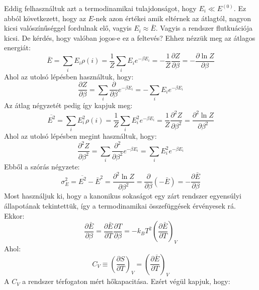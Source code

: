 \documentclass[../main.tex]{subfiles}
\begin{document}
Eddig felhasználtuk azt a termodinamikai tulajdonságot, hogy $E_i \ll E^{(0)}$. Ez abból következett, hogy az $E$-nek azon értékei amik eltérnek az átlagtól, nagyon kicsi valószínűséggel fordulnak elő,
vagyis $E_i \approx \bar{E}$. Vagyis a rendszer flutkuációja kicsi. De kérdés, hogy valóban jogos-e ez a feltevés? Ehhez nézzük meg az átlagos energiát:
\begin{equation}
    \bar{E} = \sum_i E_i \rho(i) = \frac{1}{Z} \sum_i E_i e^{-\beta E_i} = - \frac{1}{Z} \frac{\partial Z}{\partial \beta} = - \frac{\partial \ln Z}{\partial \beta}
\end{equation}
Ahol az utolsó lépésben használtuk, hogy:
\begin{equation}
    \frac{\partial Z}{\partial \beta} = \sum_i \frac{\partial}{\partial \beta} e^{-\beta E_i} = - \sum_i E_i e^{-\beta E_i}
\end{equation}
Az átlag négyzetét pedig így kapjuk meg:
\begin{equation}
    \overline{E^2} = \sum_i E_i^2 \rho(i) = \frac{1}{Z} \sum_i E_i^2 e^{-\beta E_i} = \frac{1}{Z} \frac{\partial^2 Z}{\partial \beta^2} = \frac{\partial^2 \ln Z}{\partial \beta^2}
\end{equation}
Ahol az utolsó lépésben megint használtuk, hogy:
\begin{equation}
    \frac{\partial^2 Z}{\partial \beta^2} = \sum_i \frac{\partial^2}{\partial \beta^2} e^{-\beta E_i} = \sum_i E_i^2 e^{-\beta E_i}
\end{equation}
Ebből a szórás négyzete:
\begin{equation}
    \sigma_E^2 = \overline{E^2} - \bar{E}^2 = \frac{\partial^2 \ln Z}{\partial \beta^2} = \frac{\partial }{\partial \beta} \left( - \bar{E} \right) = - \frac{\partial \bar{E}}{\partial \beta}
\end{equation}
Most használjuk ki, hogy a kanonikus sokaságot egy zárt rendszer egyensúlyi állapotának tekintettük, így a termodinamikai összefüggések érvényesek rá. Ekkor:
\begin{equation}
    \frac{\partial \bar{E}}{\partial \beta} = \frac{\partial \bar{E}}{\partial T} \frac{\partial T}{\partial \beta} = - k_B T^2 \left( \frac{\partial \bar{E}}{\partial T} \right)_V
\end{equation}
Ahol:
\begin{equation}
   C_V \equiv \left(\frac{\partial S}{\partial T}\right)_V = \left( \frac{\partial \bar{E}}{\partial T} \right)_V
\end{equation}
A $C_V$ a rendszer térfogaton mért hőkapacitása. Ezért végül kapjuk, hogy:
\end{document}
